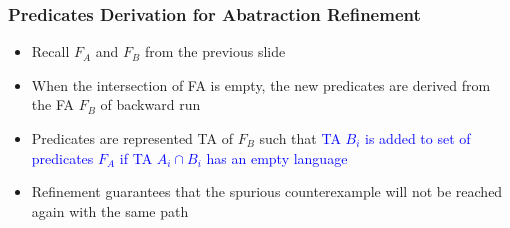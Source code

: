 \documentclass{beamer}
\newcommand{\hlbl}[1]{\textcolor{blue}{#1}}
\begin{document}
\begin{frame}
\frametitle{Predicates Derivation for Abatraction Refinement}

	\begin{itemize}
		\item Recall $F_A$ and $F_B$ from the previous slide
		\item When the intersection of FA is empty, the new predicates are derived
			from the FA $F_B$ of backward run
		\item Predicates are represented TA of $F_B$ such that \hlbl{TA $B_i$ is added
			to set of predicates $F_A$ if TA $A_i \cap B_i$ has an empty language}
		\item Refinement guarantees that the spurious counterexample will not
			be reached again with the same path
	\end{itemize}

\end{frame}
\end{document}
